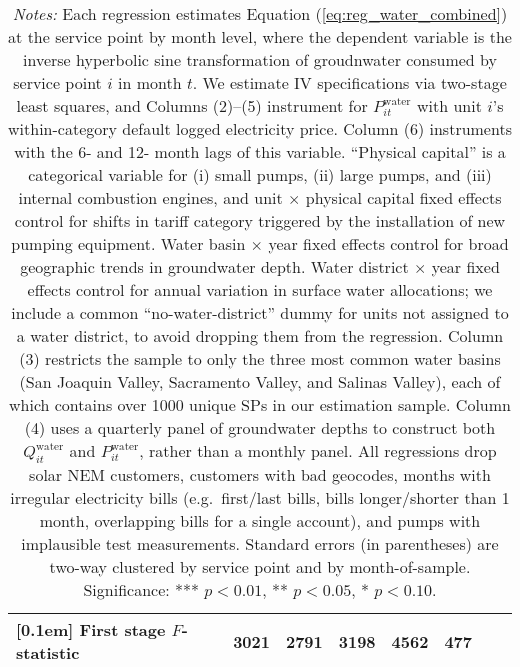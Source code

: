 \begin{table}[t!]
\begin{adjustbox}{center}
\begin{tabular}{lcccccccc}
[0.1em] 
First stage $F$-statistic &  & 3021 & 2791 & 3198 & 4562 & 477 \\ 
[0.15em]
\hline
\end{tabular}
\end{adjustbox}
\captionsetup{width=\textwidth}
\caption*{\scriptsize \emph{Notes:} 
Each regression estimates Equation (\ref{eq:reg_water_combined}) at the service point by month level,
where the dependent variable is the inverse hyperbolic sine transformation 
of groudnwater consumed by service point $i$ in month $t$.
We estimate IV specifications via two-stage least squares, and Columns (2)--(5) instrument  
for $P^{\text{water}}_{it}$ with unit $i$'s within-category default logged electricity price. 
Column (6) instruments with the 6- and 12- month lags of this variable.
``Physical capital'' is a categorical variable for (i) small pumps, (ii) large pumps, and (iii) 
internal combustion engines, and unit $\times$ physical capital fixed effects control for shifts 
in tariff category triggered by the installation of new pumping equipment.
Water basin $\times$ year fixed effects control for broad geographic trends in groundwater depth.
Water district $\times$ year fixed effects control for annual variation in surface water allocations; 
we include a common ``no-water-district'' dummy for units not assigned to a water district, to avoid dropping them from the regression. 
Column (3) restricts the sample to only the three most common water basins (San Joaquin Valley, 
Sacramento Valley, and Salinas Valley), each of which contains over 1000 unique SPs in our estimation sample.
Column (4) uses a quarterly panel of groundwater depths to construct both $Q^{\text{water}}_{it}$ and $P^{\text{water}}_{it}$, 
rather than a monthly panel.
All regressions drop solar NEM customers, customers with bad geocodes, months with irregular electricity bills 
(e.g.\ first/last bills, bills longer/shorter than 1 month, overlapping bills for a single account),
and pumps with implausible test measurements.
Standard errors (in parentheses) are two-way clustered by service point and by month-of-sample.
Significance: *** $p < 0.01$, ** $p < 0.05$, * $p < 0.10$.
}
\end{table}

